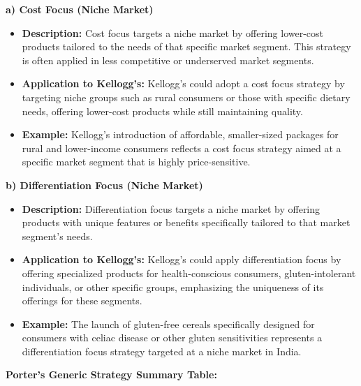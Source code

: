 \documentclass[10pt,a4paper]{book}
\begin{document}
\vspace{0.5cm}

\textbf{a) Cost Focus (Niche Market)}
\begin{itemize}
    \item \textbf{Description:} Cost focus targets a niche market by offering lower-cost products tailored to the needs of that specific market segment. This strategy is often applied in less competitive or underserved market segments.
    \item \textbf{Application to Kellogg's:} Kellogg’s could adopt a cost focus strategy by targeting niche groups such as rural consumers or those with specific dietary needs, offering lower-cost products while still maintaining quality.
    \item \textbf{Example:} Kellogg’s introduction of affordable, smaller-sized packages for rural and lower-income consumers reflects a cost focus strategy aimed at a specific market segment that is highly price-sensitive.
\end{itemize}

\vspace{0.5cm}

\textbf{b) Differentiation Focus (Niche Market)}
\begin{itemize}
    \item \textbf{Description:} Differentiation focus targets a niche market by offering products with unique features or benefits specifically tailored to that market segment’s needs.
    \item \textbf{Application to Kellogg's:} Kellogg’s could apply differentiation focus by offering specialized products for health-conscious consumers, gluten-intolerant individuals, or other specific groups, emphasizing the uniqueness of its offerings for these segments.
    \item \textbf{Example:} The launch of gluten-free cereals specifically designed for consumers with celiac disease or other gluten sensitivities represents a differentiation focus strategy targeted at a niche market in India.
\end{itemize}

\vspace{0.5cm}

\textbf{Porter's Generic Strategy Summary Table:}
\end{document}
